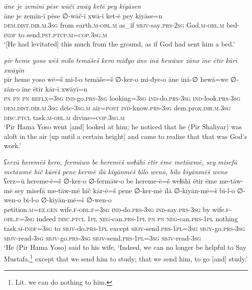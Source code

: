 \ea \label{ŽP.69}
\textit{āne je zemīnī pēse wāčī xwāy ketē pey kīyāsen} \\ 
\gll āne je zemīn-ī pēse ∅-wāč-ī xwā-ī ket-ē pey kīyāse=n \\ 
 \textsc{dem.dist}\textsc{.dir}\textsc{.m}\textsc{.3sg} from earth\textsc{.m}\textsc{-obl}\textsc{.m} as\_if \textsc{sbjv-}say\textsc{.prs-}\textsc{2sg} God\textsc{.m}\textsc{-obl}\textsc{.m} bed\textsc{-indf} to send\textsc{.pst}\textsc{.ptcp}\textsc{.m}\textsc{=cop}\textsc{.3sg}\textsc{.m} \\ 
\glt `[He had levitated] this much from the ground, as if God had sent him a bed.'
\z 
 
\ea \label{ŽP.71}
\textit{pīr heme yoso wēš milo temāšeš kero miđyo āne īnā hewāwe zāno īne ētir kārī xwāyīn} \\ 
\gll pīr heme yoso wē=š mi-l-o temāše=š ∅-ker-o mi-đye-o āne īnā-∅ hewā=we ∅-zān-o īne ētir kār-ī xwāyī=n \\ 
 \textsc{pn} \textsc{pn} \textsc{pn} \textsc{reflx}\textsc{=3sg} \textsc{ind-}go\textsc{.prs}\textsc{-3sg} looking\textsc{=3sg} \textsc{ind-}do\textsc{.prs}\textsc{-3sg} \textsc{ind-}look\textsc{.prs}\textsc{-3sg} \textsc{dem.dist}\textsc{.dir}\textsc{.m}\textsc{.3sg} deic\textsc{-3sg}\textsc{.m} air\textsc{=\textsc{post}} \textsc{ind-}know\textsc{.prs}\textsc{-3sg} dem.prox\textsc{.dir}\textsc{.m}\textsc{.3sg} \textsc{disc.ptcl} task\textsc{.m}\textsc{-obl}\textsc{.m} divine\textsc{=cop}\textsc{.3sg}\textsc{.m} \\ 
\glt `Pir Hama Yoso went [and] looked at him; he noticed that he (Pir Shaliyar) was aloft in the air [up until a certain height] and came to realise that that was God’s work.'
\z 
 
\ea \label{ŽP.72}
\textit{ʕerzū heremēš kero, fermāwo be heremēš weɫāhī ētir ēme metāwmē, sey misefā metāwmē hīč kārēš pene kermē īlā kīyānmēš bilo weno, bilo kīyānmēš weno} \\ 
\gll ʕerz=ū hereme-ē=š ∅-ker-o ∅-fermāw-o be hereme-ē=š weɫāhī ētir ēme me-tāw-mē sey misefā me-tāw-mē hīč kār-ē=š pene ∅-ker-mē īlā ∅-kīyān-mē=š bi-l-o ∅-wen-o bi-l-o ∅-kīyān-mē=š ∅-wen-o \\ 
 petition\textsc{.m}\textsc{\textsc{=ez.gen}} wife\textsc{.f}\textsc{-obl}\textsc{.f}\textsc{=3sg} \textsc{ind-}do\textsc{.prs}\textsc{-3sg} \textsc{ind-}say\textsc{.prs}\textsc{-3sg} by wife\textsc{.f}\textsc{-obl}\textsc{.f}\textsc{=3sg} indeed \textsc{disc.ptcl} \textsc{1pl} \textsc{neg-}can\textsc{.prs}\textsc{-1pl} \textsc{pn} \textsc{pn} \textsc{neg-}can\textsc{.prs}\textsc{-1pl} nothing task\textsc{.m}\textsc{-indf}\textsc{=3sg} to \textsc{sbjv-}do\textsc{.prs}\textsc{-1pl} except \textsc{sbjv-}send\textsc{.prs}\textsc{-1pl}\textsc{=3sg} \textsc{sbjv-}go\textsc{.prs}\textsc{-3sg} \textsc{sbjv-}read\textsc{-3sg} \textsc{sbjv-}go\textsc{.prs}\textsc{-3sg} \textsc{sbjv-}send\textsc{.prs}\textsc{-1pl}\textsc{=3sg} \textsc{sbjv-}read\textsc{-3sg} \\ 
\glt `He (Pir Hama Yoso) said to his wife, ‘Indeed, we can no longer be helpful to Say Mustafa,\footnote{Lit. we can do nothing to him.} except that we send him to study; that we send him, to go [and] study.'
\z 
 
